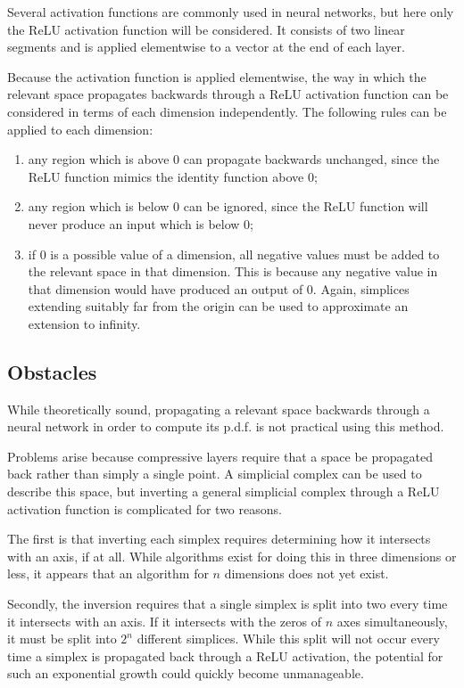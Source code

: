 \documentclass[../../main.tex]{subfiles}
\begin{document}
Several activation functions are commonly used in neural networks, but here only the ReLU activation function will be considered.
It consists of two linear segments and is applied elementwise to a vector at the end of each layer.

Because the activation function is applied elementwise, the way in which the relevant space propagates backwards through a ReLU activation function can be considered in terms of each dimension independently.
The following rules can be applied to each dimension:
\begin{enumerate}
    \item any region which is above $0$ can propagate backwards unchanged, since the ReLU function mimics the identity function above $0$;
    \item any region which is below $0$ can be ignored, since the ReLU function will never produce an input which is below $0$;
    \item if $0$ is a possible value of a dimension, all negative values must be added to the relevant space in that dimension.
    This is because any negative value in that dimension would have produced an output of $0$.
    Again, simplices extending suitably far from the origin can be used to approximate an extension to infinity.
\end{enumerate}

\subsection{Obstacles}

While theoretically sound, propagating a relevant space backwards through a neural network in order to compute its p.d.f. is not practical using this method.

Problems arise because compressive layers require that a space be propagated back rather than simply a single point.
A simplicial complex can be used to describe this space, but inverting a general simplicial complex through a ReLU activation function is complicated for two reasons.

The first is that inverting each simplex requires determining how it intersects with an axis, if at all.
While algorithms exist for doing this in three dimensions or less, it appears that an algorithm for $n$ dimensions does not yet exist.

Secondly, the inversion requires that a single simplex is split into two every time it intersects with an axis.
If it intersects with the zeros of $n$ axes simultaneously, it must be split into $2^n$ different simplices.
While this split will not occur every time a simplex is propagated back through a ReLU activation, the potential for such an exponential growth could quickly become unmanageable.
\end{document}
